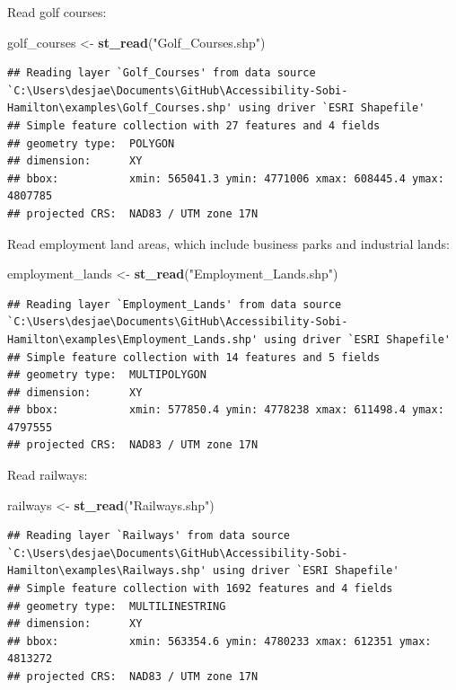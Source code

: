 \documentclass[
]{article}
\newenvironment{Shaded}{\begin{snugshade}}{\end{snugshade}}
\newcommand{\KeywordTok}[1]{\textcolor[rgb]{0.13,0.29,0.53}{\textbf{#1}}}
\newcommand{\NormalTok}[1]{#1}
\newcommand{\StringTok}[1]{\textcolor[rgb]{0.31,0.60,0.02}{#1}}
\begin{document}
Read golf courses:

\begin{Shaded}
\begin{Highlighting}[]
\NormalTok{golf_courses <-}\StringTok{ }\KeywordTok{st_read}\NormalTok{(}\StringTok{"Golf_Courses.shp"}\NormalTok{)}
\end{Highlighting}
\end{Shaded}

\begin{verbatim}
## Reading layer `Golf_Courses' from data source `C:\Users\desjae\Documents\GitHub\Accessibility-Sobi-Hamilton\examples\Golf_Courses.shp' using driver `ESRI Shapefile'
## Simple feature collection with 27 features and 4 fields
## geometry type:  POLYGON
## dimension:      XY
## bbox:           xmin: 565041.3 ymin: 4771006 xmax: 608445.4 ymax: 4807785
## projected CRS:  NAD83 / UTM zone 17N
\end{verbatim}

Read employment land areas, which include business parks and industrial
lands:

\begin{Shaded}
\begin{Highlighting}[]
\NormalTok{employment_lands <-}\StringTok{ }\KeywordTok{st_read}\NormalTok{(}\StringTok{"Employment_Lands.shp"}\NormalTok{)}
\end{Highlighting}
\end{Shaded}

\begin{verbatim}
## Reading layer `Employment_Lands' from data source `C:\Users\desjae\Documents\GitHub\Accessibility-Sobi-Hamilton\examples\Employment_Lands.shp' using driver `ESRI Shapefile'
## Simple feature collection with 14 features and 5 fields
## geometry type:  MULTIPOLYGON
## dimension:      XY
## bbox:           xmin: 577850.4 ymin: 4778238 xmax: 611498.4 ymax: 4797555
## projected CRS:  NAD83 / UTM zone 17N
\end{verbatim}

Read railways:

\begin{Shaded}
\begin{Highlighting}[]
\NormalTok{railways <-}\StringTok{ }\KeywordTok{st_read}\NormalTok{(}\StringTok{"Railways.shp"}\NormalTok{)}
\end{Highlighting}
\end{Shaded}

\begin{verbatim}
## Reading layer `Railways' from data source `C:\Users\desjae\Documents\GitHub\Accessibility-Sobi-Hamilton\examples\Railways.shp' using driver `ESRI Shapefile'
## Simple feature collection with 1692 features and 4 fields
## geometry type:  MULTILINESTRING
## dimension:      XY
## bbox:           xmin: 563354.6 ymin: 4780233 xmax: 612351 ymax: 4813272
## projected CRS:  NAD83 / UTM zone 17N
\end{verbatim}
\end{document}
